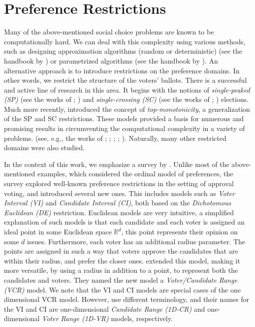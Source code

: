 \section{Preference Restrictions}\label{ch:intro:sec:restrictions}
Many of the above-mentioned social choice problems are known to be computationally hard.
We can deal with this complexity using various methods,
such as designing approximation algorithms (random or deterministic) (see the handbook by \cite{vazirani-approximation})
or parametrized algorithms (see the handbook by \cite{cygan-parameterized}).
An alternative approach is to introduce restrictions on the preference domains.
In other words, we restrict the structure of the voters' ballots. 
There is a successful and active line of research in this area.
It begins with the notions of \textit{single-peaked (SP)} (see the works of \cite{Black-single-peaked}; \cite{arrow-single-peaked})
and \textit{single-crossing (SC)} (see the works of \cite{mirrlees-single-crossing}; \cite{roberts-single-crossing}) elections.
Much more recently, \cite{barbera-top-monotonicity} introduced the concept of \textit{top-monotonicity},
a generalization of the SP and SC restrictions.
These models provided a basis for numerous and promising results in circumventing the computational complexity in a variety of problems.
(see, e.g., the works of \cite{walsh-pref-restrictions}; \cite{control-sp-shield-faliszewski-hemaspaandra};
 \cite{skowron-pref-restrictions}; \cite{brand-pref-restrictions}; \cite{elkind-pref-restrictions}).
Naturally, many other restricted domains were also studied.

In the context of this work, we emphasize a survey by \cite{elkind-approval-restrictions}.
Unlike most of the above-mentioned examples, which considered the ordinal model of preferences,
the survey explored well-known preference restrictions in the setting of approval voting, and
introduced several new ones. This includes models such as \textit{Voter Interval (VI)} and \textit{Candidate Interval (CI)},
both based on the \textit{Dichotomous Euclidean (DE)} restriction.
Euclidean models are very intuitive, a simplified explanation of such models is that
each candidate and each voter is assigned an ideal point in some Euclidean space $\mathbb{R}^{d}$,
this point represents their opinion on some $d$ issues. Furthermore, each voter has an additional radius parameter.
The points are assigned in such a way that voters approve the candidates that are within their radius, and prefer the closer ones.
\cite{faliszewski-vcr} extended this model, making it more versatile,
by using a radius in addition to a point, to represent both the candidates and voters.
They named the new model a \textit{Voter/Candidate Range (VCR)} model.
We note that the VI and CI models are special cases of the one dimensional VCR model.
However, \cite{faliszewski-vcr} use different terminology,
and their names for the VI and CI are one-dimensional \textit{Candidate Range (1D-CR)}
and one-dimensional \textit{Voter Range (1D-VR)} models, respectively.

